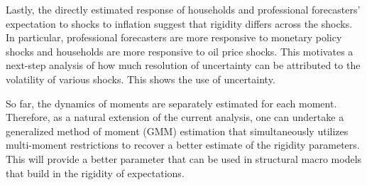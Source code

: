 \documentclass[12pt]{article}
\begin{document}
	Lastly, the directly estimated response of households and professional forecasters' expectation to shocks to inflation suggest that rigidity differs across the shocks. In particular, professional forecasters are more responsive to monetary policy shocks and households are more responsive to oil price shocks. This motivates a next-step analysis of how much resolution of uncertainty can be attributed to the volatility of various shocks. This shows the use of uncertainty.
	
	So far, the dynamics of moments are separately estimated for each moment. Therefore, as a natural extension of the current analysis, one can undertake a generalized method of moment (GMM) estimation that simultaneously utilizes multi-moment restrictions to recover a better estimate of the rigidity parameters.  This will provide a better parameter that can be used in structural macro models that build in the rigidity of expectations. 
	
	
	
	
\end{document}
